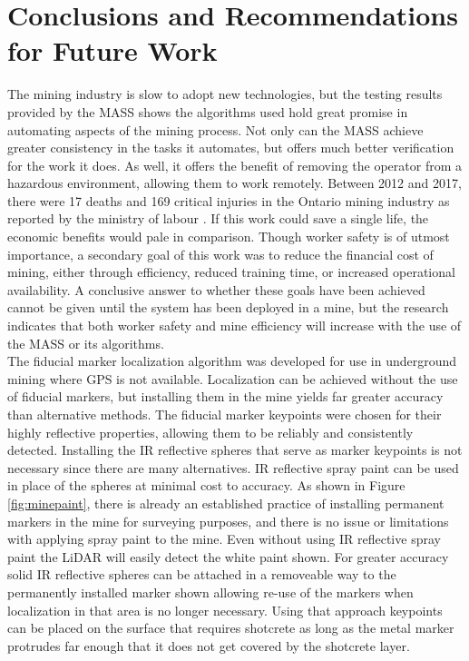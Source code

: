 \chapter{Conclusions and Recommendations for Future Work}
\label{chap:conclusions}
The mining industry is slow to adopt new technologies, but the testing results provided by the MASS shows the algorithms used hold great promise in automating aspects of the mining process. Not only can the MASS achieve greater consistency in the tasks it automates, but offers much better verification for the work it does. As well, it offers the benefit of removing the operator from a hazardous environment, allowing them to work remotely. Between 2012 and 2017, there were 17 deaths and 169 critical injuries in the Ontario mining industry as reported by the ministry of labour \cite{seebelow}. If this work could save a single life, the economic benefits would pale in comparison. Though worker safety is of utmost importance, a secondary goal of this work was to reduce the financial cost of mining, either through efficiency, reduced training time, or increased operational availability. A conclusive answer to whether these goals have been achieved cannot be given until the system has been deployed in a mine, but the research indicates that both worker safety and mine efficiency will increase with the use of the MASS or its algorithms.\\

The fiducial marker localization algorithm was developed for use in underground mining where GPS is not available. Localization can be achieved without the use of fiducial markers, but installing them in the mine yields far greater accuracy than alternative methods. The fiducial marker keypoints were chosen for their highly reflective properties, allowing them to be reliably and consistently detected. Installing the IR reflective spheres that serve as marker keypoints is not necessary since there are many alternatives. IR reflective spray paint can be used in place of the spheres at minimal cost to accuracy. As shown in Figure \ref{fig:minepaint}, there is already an established practice of installing permanent markers in the mine for surveying purposes, and there is no issue or limitations with applying spray paint to the mine. Even without using IR reflective spray paint the LiDAR will easily detect the white paint shown. For greater accuracy solid IR reflective spheres can be attached in a removeable way to the permanently installed marker shown allowing re-use of the markers when localization in that area is no longer necessary. Using that approach keypoints can be placed on the surface that requires shotcrete as long as the metal marker protrudes far enough that it does not get covered by the shotcrete layer.\\

